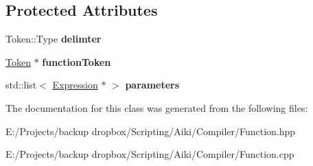 \subsection*{Protected Attributes}
\begin{DoxyCompactItemize}
\item 
\hypertarget{a00009_aaa4480d7bf30a98289bf80d7aeff4430}{Token\+::\+Type {\bfseries delimter}}\label{a00009_aaa4480d7bf30a98289bf80d7aeff4430}

\item 
\hypertarget{a00009_aeeb16256fafa10242b270d4bf417bad0}{\hyperlink{a00025}{Token} $\ast$ {\bfseries function\+Token}}\label{a00009_aeeb16256fafa10242b270d4bf417bad0}

\item 
\hypertarget{a00009_a43942cc2f7ea191f6d3104d5bbac1e83}{std\+::list$<$ \hyperlink{a00007}{Expression} $\ast$ $>$ {\bfseries parameters}}\label{a00009_a43942cc2f7ea191f6d3104d5bbac1e83}

\end{DoxyCompactItemize}


The documentation for this class was generated from the following files\+:\begin{DoxyCompactItemize}
\item 
E\+:/\+Projects/backup dropbox/\+Scripting/\+Aiki/\+Compiler/Function.\+hpp\item 
E\+:/\+Projects/backup dropbox/\+Scripting/\+Aiki/\+Compiler/Function.\+cpp\end{DoxyCompactItemize}
